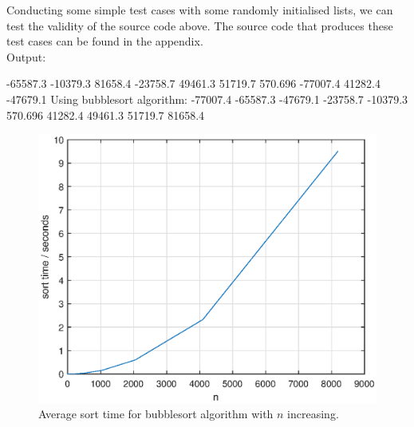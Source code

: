 \documentclass[a4paper, 12pt]{article}
\begin{document}
Conducting some simple test cases with some randomly initialised lists, we can test the validity of the source code above. The source code that produces these test cases can be found in the appendix.\\ 
Output:
\begin{spverbatim}
-65587.3 -10379.3 81658.4 -23758.7 49461.3 51719.7 570.696 -77007.4 41282.4 -47679.1
Using bubblesort algorithm:
-77007.4 -65587.3 -47679.1 -23758.7 -10379.3 570.696 41282.4 49461.3 51719.7 81658.4
\end{spverbatim}
\begin{figure}[H]
\centering
\includegraphics[scale = 0.75]{Bubblesort_average_time}
\caption{Average sort time for bubblesort algorithm with $n$ increasing.}
\end{figure}
\end{document}
